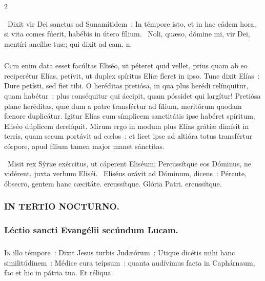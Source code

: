 \documentclass[9pt,twoside]{extarticle}
\begin{document}
\begin{multicols}{2}
\begin{tightlist}{}
\item {}~Dixit vir Dei sanctus ad Sunamítidem~: \textred{*} In témpore isto, et in hac eádem hora, si vita comes fúerit, habébis in útero fílium. ~Noli, quæso, dómine mi, vir Dei, mentíri ancíllæ tuæ; qui dixit ad eam. n.
\end{tightlist}

\subsubsection*{\center {}}
\lettrine{C}um enim data esset facúltas Eliséo, ut péteret quid vellet, prius quam ab eo reciperétur Elías, petívit, ut duplex spíritus Elíæ fíeret in ipso. Tunc dixit Elías~: Dure petísti, sed fiet tibi. O heréditas pretiósa, in qua plus herédi relínquitur, quam habétur~: plus conséquitur qui áccipit, quam póssidet qui largítur! Pretiósa plane heréditas, quæ dum a patre transfértur ad fílium, meritórum quodam fœnore duplicátur. Igitur Elías cum símplicem sanctitátis ipse habéret spíritum, Eliséo dúplicem derelíquit. Mirum ergo in modum plus Elías grátiæ dimísit in terris, quam secum portávit ad cœlos~: et licet ipse ad altióra totus transfértur córpore, apud fílium tamen major manet sánctitas.

\begin{tightlist}{}
\item {}~Misit rex Sýriæ exércitus, ut cáperent Eliséum; \textred{*} Percussítque eos Dóminus, ne vidérent, juxta verbum Eliséi. ~Eliséus orávit ad Dóminum, dicens~: Pércute, óbsecro, gentem hanc cæcitáte. ercussítque. Glória Patri. ercussítque.
\end{tightlist}

\subsubsection*{\center \textsc{IN TERTIO NOCTURNO.}}
\subsubsection*{\center Léctio sancti Evangélii secúndum Lucam.}
\subsubsection*{\center {}}
\lettrine{I}n illo témpore~: Dixit Jesus turbis Judæórum~: Utique dicétis mihi hanc similitúdinem~: Médice cura teípsum~: quanta audívimus facta in Caphárnaum, fac et hic in pátria tua. Et réliqua.


\end{multicols}
\end{document}
